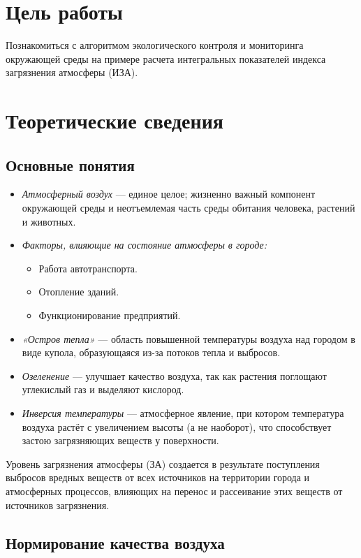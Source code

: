 \section*{Цель работы}
Познакомиться с алгоритмом экологического контроля и мониторинга окружающей среды на примере расчета интегральных показателей индекса загрязнения атмосферы (ИЗА).

\section*{Теоретические сведения}

\subsection*{Основные понятия}

\begin{itemize}
    \item \textit{Атмосферный воздух} --- единое целое; жизненно важный компонент окружающей среды и неотъемлемая часть среды обитания человека, растений и животных.
    \item \textit{Факторы, влияющие на состояние атмосферы в городе:}
          \begin{itemize}
              \item Работа автотранспорта.
              \item Отопление зданий.
              \item Функционирование предприятий.
          \end{itemize}
    \item \textit{«Остров тепла»} --- область повышенной температуры воздуха над городом в виде купола, образующаяся из-за потоков тепла и выбросов.
    \item \textit{Озеленение} --- улучшает качество воздуха, так как растения поглощают углекислый газ и выделяют кислород.
    \item \textit{Инверсия температуры} --- атмосферное явление, при котором температура воздуха растёт с увеличением высоты (а не наоборот), что способствует застою загрязняющих веществ у поверхности.
\end{itemize}

Уровень загрязнения атмосферы (ЗА) создается в результате поступления выбросов вредных веществ от всех источников на территории города и атмосферных процессов, влияющих на перенос и рассеивание этих веществ от источников загрязнения.

\subsection*{Нормирование качества воздуха}

